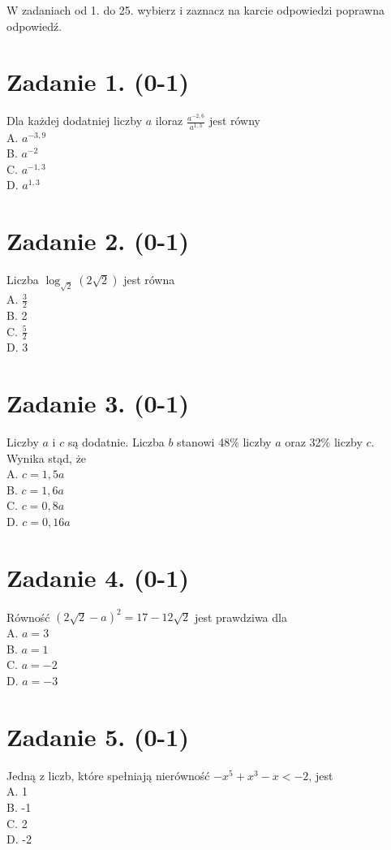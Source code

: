 \documentclass[10pt]{article}
\begin{document}
W zadaniach od 1. do 25. wybierz i zaznacz na karcie odpowiedzi poprawna odpowiedź.

\section*{Zadanie 1. (0-1)}
Dla każdej dodatniej liczby \(a\) iloraz \(\frac{a^{-2,6}}{a^{1,3}}\) jest równy\\
A. \(a^{-3,9}\)\\
B. \(a^{-2}\)\\
C. \(a^{-1,3}\)\\
D. \(a^{1,3}\)

\section*{Zadanie 2. (0-1)}
Liczba \(\log _{\sqrt{2}}(2 \sqrt{2})\) jest równa\\
A. \(\frac{3}{2}\)\\
B. 2\\
C. \(\frac{5}{2}\)\\
D. 3

\section*{Zadanie 3. (0-1)}
Liczby \(a\) i \(c\) są dodatnie. Liczba \(b\) stanowi 48\% liczby \(a\) oraz 32\% liczby \(c\). Wynika stąd, że\\
A. \(c=1,5 a\)\\
B. \(c=1,6 a\)\\
C. \(c=0,8 a\)\\
D. \(c=0,16 a\)

\section*{Zadanie 4. (0-1)}
Równość \((2 \sqrt{2}-a)^{2}=17-12 \sqrt{2}\) jest prawdziwa dla\\
A. \(a=3\)\\
B. \(a=1\)\\
C. \(a=-2\)\\
D. \(a=-3\)

\section*{Zadanie 5. (0-1)}
Jedną z liczb, które spełniają nierówność \(-x^{5}+x^{3}-x<-2\), jest\\
A. 1\\
B. -1\\
C. 2\\
D. -2
\end{document}
